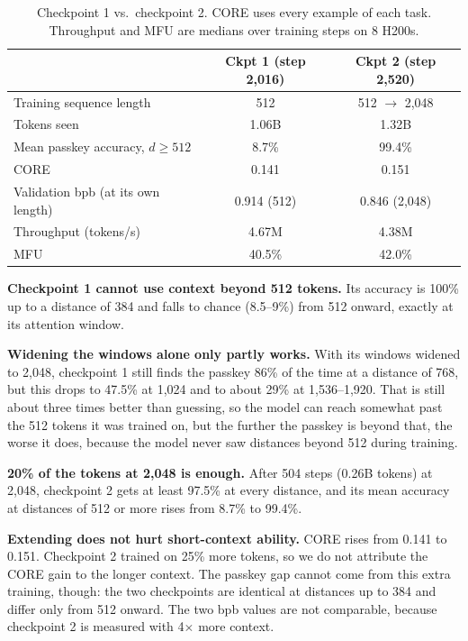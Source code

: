 \documentclass[11pt]{article}
\begin{document}
{\small
\renewcommand{\arraystretch}{1.15}
\begin{table}[H]
\centering
\caption{Checkpoint 1 vs.\ checkpoint 2. CORE uses every example of each task. Throughput and MFU are medians over training steps on 8 H200s.}\label{tab:ckpts}
\begin{tabular}{l cc}
\toprule
 & \textbf{Ckpt 1 (step 2,016)} & \textbf{Ckpt 2 (step 2,520)} \\
\midrule
Training sequence length & 512 & 512 $\rightarrow$ 2,048 \\
Tokens seen & 1.06B & 1.32B \\
Mean passkey accuracy, $d \geq 512$ & 8.7\% & 99.4\% \\
CORE & 0.141 & 0.151 \\
Validation bpb (at its own length) & 0.914 (512) & 0.846 (2,048) \\
Throughput (tokens/s) & 4.67M & 4.38M \\
MFU & 40.5\% & 42.0\% \\
\bottomrule
\end{tabular}
\end{table}
}

\textbf{Checkpoint 1 cannot use context beyond 512 tokens.} Its accuracy is 100\% up to a distance of 384 and falls to chance (8.5--9\%) from 512 onward, exactly at its attention window.

\textbf{Widening the windows alone only partly works.} With its windows widened to 2,048, checkpoint 1 still finds the passkey 86\% of the time at a distance of 768, but this drops to 47.5\% at 1,024 and to about 29\% at 1,536--1,920. That is still about three times better than guessing, so the model can reach somewhat past the 512 tokens it was trained on, but the further the passkey is beyond that, the worse it does, because the model never saw distances beyond 512 during training.

\textbf{20\% of the tokens at 2,048 is enough.} After 504 steps (0.26B tokens) at 2,048, checkpoint 2 gets at least 97.5\% at every distance, and its mean accuracy at distances of 512 or more rises from 8.7\% to 99.4\%.

\textbf{Extending does not hurt short-context ability.} CORE rises from 0.141 to 0.151. Checkpoint 2 trained on 25\% more tokens, so we do not attribute the CORE gain to the longer context. The passkey gap cannot come from this extra training, though: the two checkpoints are identical at distances up to 384 and differ only from 512 onward. The two bpb values are not comparable, because checkpoint 2 is measured with 4$\times$ more context.
\end{document}
